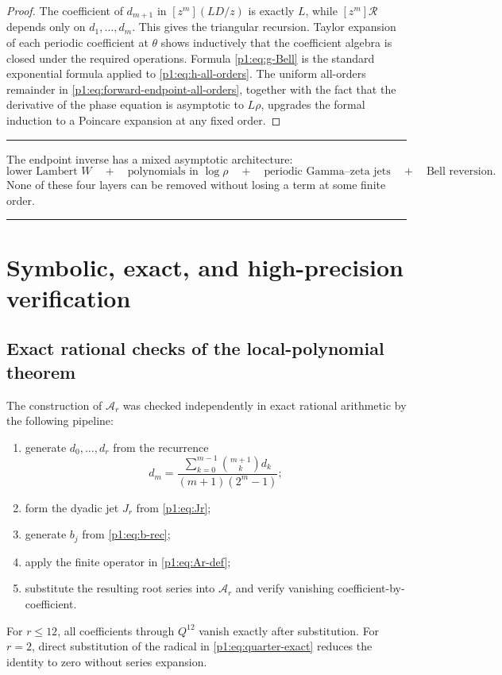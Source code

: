 \documentclass[11pt,oneside]{article}
\numberwithin{equation}{section}
\theoremstyle{definition}
\theoremstyle{remark}
\newenvironment{boxedremark}{%
  \par\smallskip\noindent\begin{center}\begin{minipage}{0.94\textwidth}%
  \color{black}\hrule\vspace{0.6em}\small
}{%
  \vspace{0.6em}\hrule\end{minipage}\end{center}\smallskip
}
\begin{document}
\begin{proof}
The coefficient of $d_{m+1}$ in $[z^m](L D/z)$ is exactly $L$, while
$[z^m]\mathcal R$ depends only on $d_1,\ldots,d_m$.  This gives the triangular
recursion.  Taylor expansion of each periodic coefficient at $\theta$ shows inductively
that the coefficient algebra is closed under the required operations.  Formula
\eqref{p1:eq:g-Bell} is the standard exponential formula applied to
\eqref{p1:eq:h-all-orders}.  The uniform all-orders remainder in
\eqref{p1:eq:forward-endpoint-all-orders}, together with the fact that the derivative of the
phase equation is asymptotic to $L\rho$, upgrades the formal induction to a Poincare
expansion at any fixed order.
\end{proof}

\begin{boxedremark}
The endpoint inverse has a mixed asymptotic architecture:
\[
 \text{lower Lambert }W
 \quad+\quad \text{polynomials in }\log\rho
 \quad+\quad \text{periodic Gamma--zeta jets}
 \quad+\quad \text{Bell reversion}.
\]
None of these four layers can be removed without losing a term at some finite order.
\end{boxedremark}

\section{Symbolic, exact, and high-precision verification}
\label{p1:sec:verification}

\subsection{Exact rational checks of the local-polynomial theorem}

The construction of $\mathcal A_r$ was checked independently in exact rational
arithmetic by the following pipeline:
\begin{enumerate}
 \item generate $d_0,\ldots,d_r$ from the recurrence
 \begin{equation}
 d_m=\frac{\sum_{k=0}^{m-1}\binom{m+1}{k}d_k}
 {(m+1)(2^m-1)};
 \label{p1:eq:d-recurrence-check}
 \end{equation}
 \item form the dyadic jet $J_r$ from \eqref{p1:eq:Jr};
 \item generate $b_j$ from \eqref{p1:eq:b-rec};
 \item apply the finite operator in \eqref{p1:eq:Ar-def};
 \item substitute the resulting root series into $\mathcal A_r$ and verify vanishing
 coefficient-by-coefficient.
\end{enumerate}
For $r\le12$, all coefficients through $Q^{12}$ vanish exactly after substitution.
For $r=2$, direct substitution of the radical in \eqref{p1:eq:quarter-exact} reduces the
identity to zero without series expansion.
\end{document}

